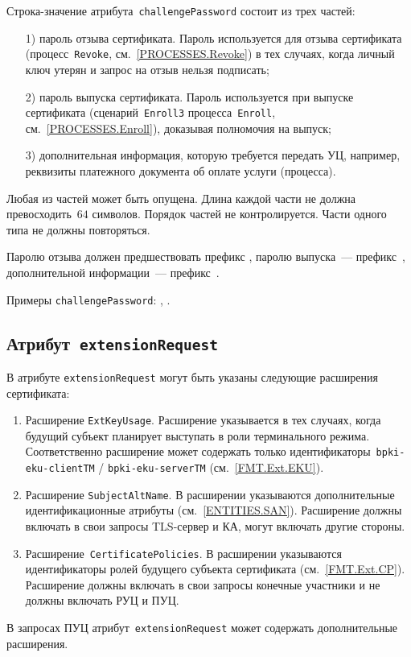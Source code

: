 Строка-значение атрибута~\texttt{challengePassword} состоит из трех частей:
\begin{enumerate} 
\item[1)]
пароль отзыва сертификата. Пароль используется для отзыва сертификата
(процесс~\texttt{Revoke}, см.~\ref{PROCESSES.Revoke})
в тех случаях, когда личный ключ утерян и запрос на отзыв нельзя 
подписать;
\item[2)]
пароль выпуска сертификата. Пароль используется при выпуске сертификата
(сценарий~\texttt{Enroll3} процесса~\texttt{Enroll}, 
см.~\ref{PROCESSES.Enroll}), доказывая полномочия на выпуск;
\item[3)]
дополнительная информация, которую требуется передать УЦ,
например, реквизиты платежного документа об оплате услуги (процесса).
\end{enumerate}

Любая из частей может быть опущена. Длина каждой части не должна 
превосходить~$64$ символов. Порядок частей не контролируется.
Части одного типа не должны повторяться.

Паролю отзыва должен предшествовать префикс 
, паролю выпуска~--- префикс~,
дополнительной информации~--- префикс~.

Примеры \texttt{challengePassword}:
, .

\subsection{Атрибут~\texttt{extensionRequest}}\label{FMT.CSR.ER}

В атрибуте \texttt{extensionRequest} могут быть указаны следующие 
расширения сертификата:
\begin{enumerate}
\item 
Расширение \texttt{ExtKeyUsage}. Расширение указывается в тех случаях, 
когда будущий субъект планирует выступать в роли  
терминального режима. Соответственно расширение может содержать только 
идентификаторы~\verb|bpki-eku-clientTM| / \verb|bpki-eku-serverTM| 
(см.~\ref{FMT.Ext.EKU}). 


\item 
Расширение \texttt{SubjectAltName}. В расширении указываются 
дополнительные идентификационные атрибуты (см.~\ref{ENTITIES.SAN}). 
Расширение должны включать в свои запросы TLS-сервер и КА,
могут включать другие стороны.

\item
Расширение~\texttt{CertificatePolicies}. В расширении
указываются идентификаторы ролей будущего субъекта сертификата
(см.~\ref{FMT.Ext.CP}).
Расширение должны включать в свои запросы конечные участники 
и не должны включать РУЦ и ПУЦ.
\end{enumerate}

В запросах ПУЦ атрибут~\texttt{extensionRequest} может содержать 
дополнительные расширения.
